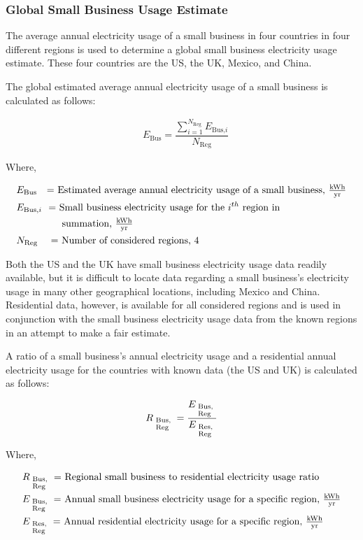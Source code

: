 \subsubsection{Global Small Business Usage Estimate}\label{sec:branches-small-bus-est}
The average annual electricity usage of a small business in four countries in four different regions is used to determine a global small business electricity usage estimate.
These four countries are the US, the UK, Mexico, and China.

The global estimated average annual electricity usage of a small business is calculated as follows:

\begin{align}\label{eqn:banks-e-total}
&E_\textrm{Bus} = \dfrac{ \sum \limits_{i=1} ^ {N_\textrm{Reg} } E_{\textrm{Bus,}i } }{ N_\textrm{Reg} }
\end{align}

Where,

\begin{align*}
&E_\textrm{Bus}  \textrm{ \ \   = Estimated average annual electricity usage of a small business, $\tfrac{ \textrm{kWh} } { \textrm{yr} }$}  \\
&E_{\textrm{Bus,}i} \textrm{ \  = Small business electricity usage for the $i^{th}$ region in } \\ 
&\textrm{ \ \qquad \qquad summation, $\tfrac{ \textrm{kWh} } { \textrm{yr} }$} \\ 
&N_\textrm{Reg} \textrm{ \ \ \  = Number of considered regions, 4}
\end{align*}

Both the US and the UK have small business electricity usage data readily available, but it is difficult to locate data regarding a small business's electricity usage in many other geographical locations, including Mexico and China.
Residential data, however, is available for all considered regions and is used in conjunction with the small business electricity usage data from the known regions in an attempt to make a fair estimate.

A ratio of a small business's annual electricity usage and a residential annual electricity usage for the countries with known data (the US and UK) is calculated as follows:

\begin{align}\label{eqn:banks-ratio-bus-reg}
  R_{\begin{subarray}{l} \textrm{ {Bus,} } \\ \textrm{ {Reg} } \end{subarray} } = \frac{ E_{\begin{subarray}{l} \textrm{ {Bus,} } \\ \textrm{ {Reg} } \end{subarray} } }{ E_{\begin{subarray}{l} \textrm{ {Res,} } \\ \textrm{ {Reg} } \end{subarray} } }
\end{align}

Where,


\begin{align*}
&R_{ \begin{subarray}{l} \textrm{ {Bus,} } \\ \textrm{ {Reg} } \end{subarray} } \textrm{  = Regional small business to residential electricity usage ratio } \\
&E_{\begin{subarray}{l} \textrm{ {Bus,} } \\ \textrm{ {Reg} } \end{subarray} } \textrm{   = Annual small business electricity usage for a specific region, $\tfrac{ \textrm{kWh} } { \textrm{yr} }$} \\ 
&E_ { \begin{subarray}{l} \textrm{ {Res,} } \\ \textrm{ {Reg} } \end{subarray} } \textrm{ = Annual residential electricity usage for a specific region, $\tfrac{ \textrm{kWh} } { \textrm{yr} }$}
\end{align*}

